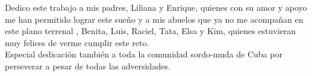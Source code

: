 \begin{dedication}
    Dedico este trabajo a mis padres, Liliana y Enrique, quienes con su amor y apoyo me han permitido lograr este sueño y a mis abuelos que ya no me acompañan en este plano terrenal , Benita, Luis, Raciel, Tata, Elsa y Kim, quienes estuvieran muy felices de verme cumplir este reto.\\
    \vspace{25 pt}
    Especial dedicación también a toda la comunidad sordo-muda de Cuba por perseverar a pesar de todas las adversidades.
    
\end{dedication}